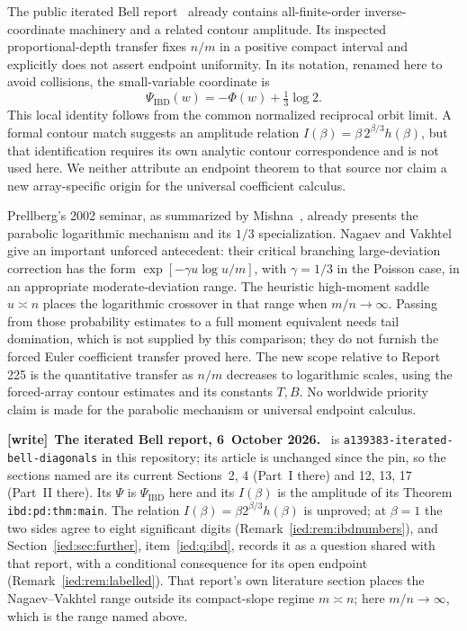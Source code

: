 \documentclass[11pt,letterpaper]{article}
\theoremstyle{remark}\newtheorem{remark}[theorem]{Remark}
\newcommand{\file}[1]{\nolinkurl{#1}}
\newenvironment{writenote}[1][]{\par\smallskip\begingroup\small
 \noindent\textbf{[write]}\if\relax\detokenize{#1}\relax\else~\textbf{#1.}\fi\ }%
 {\par\endgroup\smallskip}
\begin{document}
The public iterated Bell report~\cite{IBD} already contains all-finite-order inverse-coordinate machinery and a related contour amplitude. Its inspected proportional-depth transfer fixes $n/m$ in a positive compact interval and explicitly does not assert endpoint uniformity. In its notation, renamed here to avoid collisions, the small-variable coordinate is
\[
 \Psi_{\mathrm{IBD}}(w)=-\Phi(w)+\tfrac13\log2.
\]
This local identity follows from the common normalized reciprocal orbit limit. A formal contour match suggests an amplitude relation
$I(\beta)=\beta\,2^{\beta/3}h(\beta)$, but that identification requires its own analytic contour correspondence and is not used here. We neither attribute an endpoint theorem to that source nor claim a new array-specific origin for the universal coefficient calculus.

Prellberg's 2002 seminar, as summarized by Mishna~\cite{Prellberg}, already presents the parabolic logarithmic mechanism and its $1/3$ specialization. Nagaev and Vakhtel~\cite{NV} give an important unforced antecedent: their critical branching large-deviation correction has the form
$\exp[-\gamma u\log u/m]$, with $\gamma=1/3$ in the Poisson case, in an appropriate moderate-deviation range. The heuristic high-moment saddle $u\asymp n$ places the logarithmic crossover in that range when $m/n\to\infty$. Passing from those probability estimates to a full moment equivalent needs tail domination, which is not supplied by this comparison; they do not furnish the forced Euler coefficient transfer proved here. The new scope relative to Report 225 is the quantitative transfer as $n/m$ decreases to logarithmic scales, using the forced-array contour estimates and its constants $T,B$. No worldwide priority claim is made for the parabolic mechanism or universal endpoint calculus.

\begin{writenote}[The iterated Bell report, 6~October 2026]
\cite{IBD} is \file{a139383-iterated-bell-diagonals} in this repository; its article is unchanged since the pin, so the sections named are its current Sections~2, 4 (Part~I there) and 12, 13, 17 (Part~II there). Its $\Psi$ is $\Psi_{\mathrm{IBD}}$ here and its $I(\beta)$ is the amplitude of its Theorem \texttt{ibd:pd:thm:main}. The relation $I(\beta)=\beta2^{\beta/3}h(\beta)$ is unproved; at $\beta=1$ the two sides agree to eight significant digits (Remark~\ref{ied:rem:ibdnumbers}), and Section~\ref{ied:sec:further}, item~\ref{ied:q:ibd}, records it as a question shared with that report, with a conditional consequence for its open endpoint (Remark~\ref{ied:rem:labelled}). That report's own literature section places the Nagaev--Vakhtel range outside its compact-slope regime $m\asymp n$; here $m/n\to\infty$, which is the range named above.
\end{writenote}
\end{document}
